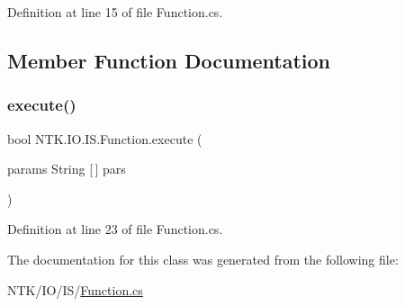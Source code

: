 Definition at line 15 of file Function.\+cs.



\subsection{Member Function Documentation}
\mbox{\label{class_n_t_k_1_1_i_o_1_1_i_s_1_1_function_a45caaf83c8d2a804829c36cb8e8ed90b}} 
\subsubsection{\texorpdfstring{execute()}{execute()}}
{\footnotesize\ttfamily bool N\+T\+K.\+I\+O.\+I\+S.\+Function.\+execute (\begin{DoxyParamCaption}\item[{params String \mbox{[}$\,$\mbox{]}}]{pars }\end{DoxyParamCaption})}



Definition at line 23 of file Function.\+cs.



The documentation for this class was generated from the following file\+:\begin{DoxyCompactItemize}
\item 
N\+T\+K/\+I\+O/\+I\+S/\mbox{\hyperlink{_function_8cs}{Function.\+cs}}\end{DoxyCompactItemize}
